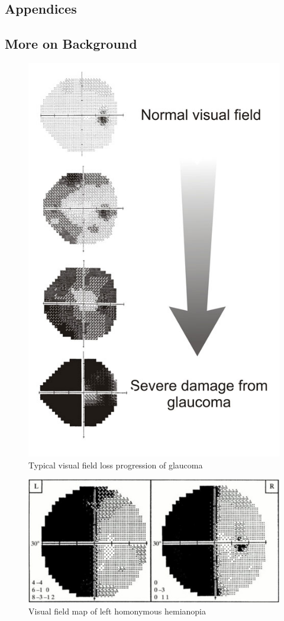 \documentclass{l4proj}
\begin{document}
\begin{appendices}

\chapter{Appendices}

\section{More on Background}

\begin{figure}[!h]
    \centering
    \includegraphics[width=0.75\linewidth]{images/Glaucoma.png}
    \caption{Typical visual field loss progression of glaucoma \citep{glaucoma4} }
    \label{fig: glaucoma progression}
\end{figure}

\begin{figure}[!h]
    \centering
    \includegraphics[width=0.75\linewidth]{images/hemanopia.png}
    \caption{Visual field map of left homonymous hemianopia \citep{hemanopia5}}
    \label{fig: hemanopia example}
\end{figure}


\end{appendices}
\end{document}

